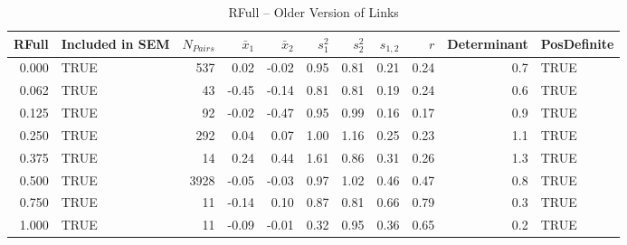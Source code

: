 \documentclass{article}\usepackage[]{graphicx}\usepackage[]{color}
\begin{document}
\begin{table}[ht]
\centering
\begin{tabular}{rlrrrrrrrrl}
  \hline
RFull & Included in SEM & $N_{Pairs}$ & $\bar{x}_1$ & $\bar{x}_2$ & $s_1^2$ & $s_2^2$ & $s_{1,2}$ & $r$ & Determinant & PosDefinite \\ 
  \hline
0.000 & TRUE & 537 & 0.02 & -0.02 & 0.95 & 0.81 & 0.21 & 0.24 & 0.7 & TRUE \\ 
  0.062 & TRUE & 43 & -0.45 & -0.14 & 0.81 & 0.81 & 0.19 & 0.24 & 0.6 & TRUE \\ 
  0.125 & TRUE & 92 & -0.02 & -0.47 & 0.95 & 0.99 & 0.16 & 0.17 & 0.9 & TRUE \\ 
  0.250 & TRUE & 292 & 0.04 & 0.07 & 1.00 & 1.16 & 0.25 & 0.23 & 1.1 & TRUE \\ 
  0.375 & TRUE & 14 & 0.24 & 0.44 & 1.61 & 0.86 & 0.31 & 0.26 & 1.3 & TRUE \\ 
  0.500 & TRUE & 3928 & -0.05 & -0.03 & 0.97 & 1.02 & 0.46 & 0.47 & 0.8 & TRUE \\ 
  0.750 & TRUE & 11 & -0.14 & 0.10 & 0.87 & 0.81 & 0.66 & 0.79 & 0.3 & TRUE \\ 
  1.000 & TRUE & 11 & -0.09 & -0.01 & 0.32 & 0.95 & 0.36 & 0.65 & 0.2 & TRUE \\ 
   \hline
\end{tabular}
\caption{RFull -- Older Version of Links} 
\end{table}
\end{document}
